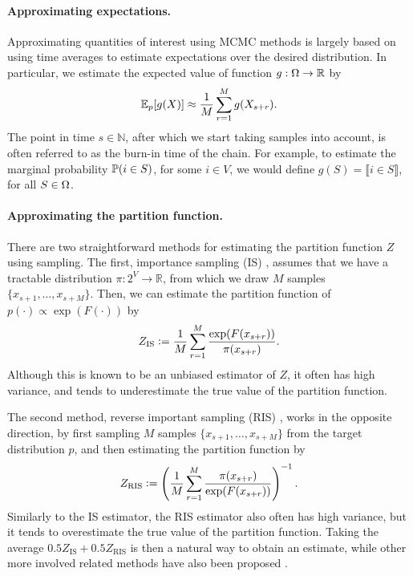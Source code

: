 \paragraph{Approximating expectations.}
Approximating quantities of interest using MCMC methods is largely based on using time averages to estimate expectations over the desired distribution.
In particular, we estimate the expected value of function $g : \ss \to \mathbb{R}$ by
\begin{align} \label{eq:exp_approx}
\E_p[g(X)] \approx \frac{1}{M}\sum_{r=1}^{M} g(X_{s + r}).
\end{align}
The point in time $s \in \mathbb{N}$, after which we start taking samples into account, is often referred to as the burn-in time of the chain.
For example, to estimate the marginal probability $\P(i \in S)$, for some $i \in V$, we would define $g(S) = \llbracket i \in S \rrbracket$, for all $S \in \ss$.

\paragraph{Approximating the partition function.}
There are two straightforward methods for estimating the partition function $Z$ using sampling.
The first, importance sampling (IS) \citep{ais}, assumes that we have a tractable distribution $\pi : 2^V \to \mathbb{R}$, from which we draw $M$ samples $\{x_{s+1}, \ldots, x_{s+M}\}$.
Then, we can estimate the partition function of $p(\cdot) \propto \exp(F(\cdot))$ by
\begin{align} \label{eq:is}
Z_{\textrm{IS}} \defeq \frac{1}{M} \sum_{r = 1}^{M} \frac{\exp(F(x_{s+r}))}{\pi(x_{s+r})}.
\end{align}
Although this is known to be an unbiased estimator of $Z$, it often has high variance, and tends to underestimate the true value of the partition function.

The second method, reverse important sampling (RIS) \citep{ris}, works in the opposite direction, by first sampling $M$ samples $\{x_{s+1}, \ldots, x_{s+M}\}$ from the target distribution $p$, and then estimating the partition function by
\begin{align} \label{eq:ris}
Z_{\textrm{RIS}} \defeq \left(\frac{1}{M} \sum_{r = 1}^{M} \frac{\pi(x_{s+r})}{\exp(F(x_{s+r}))}\right)^{-1}.
\end{align}
Similarly to the IS estimator, the RIS estimator also often has high variance, but it tends to overestimate the true value of the partition function.
Taking the average $0.5 Z_{\textrm{IS}} + 0.5 Z_{\textrm{RIS}}$ is then a natural way to obtain an estimate, while other more involved related methods have also been proposed \citep{burda15,liu15}.

